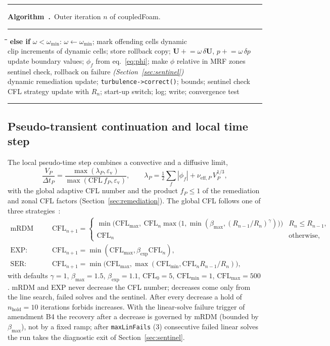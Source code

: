 \documentclass[11pt,a4paper]{article}
\newcounter{algorithm}
\newenvironment{algo}[2]{%
  \par\medskip\noindent
  \begin{minipage}{\linewidth}
  \refstepcounter{algorithm}\label{#2}%
  \hrule\smallskip\noindent\textbf{Algorithm~\thealgorithm.}\ #1\par
  \smallskip\hrule\smallskip\small
  \begin{tabbing}
  \hspace*{2em}\=\hspace*{2em}\=\hspace*{2em}\=\hspace*{2em}\=\kill}
  {\end{tabbing}\vspace*{-1ex}\hrule\end{minipage}\par\medskip}
\newcommand{\vect}[1]{\mathbf{#1}}
\newcommand{\Uv}{\vect{U}}
\newcommand{\dt}{\Delta t}
\newcommand{\VSMALL}{\varepsilon_{\mathrm{v}}}
\newcommand{\code}[1]{\texttt{#1}}
\begin{document}
\begin{algo}{Outer iteration $n$ of coupledFoam.}{alg:outer}
\textbf{else if} $\omega<\omega_{\min}$: $\omega\leftarrow\omega_{\min}$; mark offending cells dynamic\\
clip increments of dynamic cells; store rollback copy; $\Uv\mathrel{+}=\omega\,\delta\Uv$, $p\mathrel{+}=\omega\,\delta p$\\
update boundary values; $\phi_f$ from eq.~\ref{eq:phi}; make $\phi$ relative in MRF zones\\
sentinel check, rollback on failure \quad \textit{(Section~\ref{sec:sentinel})}\\
dynamic remediation update; \code{turbulence->correct()}; bounds; sentinel check\\
CFL strategy update with $R_n$; start-up switch; log; write; convergence test
\end{algo}

\subsection{Pseudo-transient continuation and local time step}\label{sec:ptc}

The local pseudo-time step combines a convective and a diffusive limit,
\begin{equation}
  \frac{V_P}{\dt_P} = \frac{\max(\lambda_P,\VSMALL)}{\max(\mathrm{CFL}\,f_P,\VSMALL)},
  \qquad
  \lambda_P = \tfrac12\sum_f|\phi_f| + \nu_{\mathrm{eff},P}\,V_P^{1/3},
  \label{eq:dt}
\end{equation}
with the global adaptive CFL number and the product $f_P\le1$ of the
remediation and zonal CFL factors (Section~\ref{sec:remediation}). The global
CFL follows one of three strategies~\cite{Ceze2011,Ceze2013AIAA,MulderVanLeer1985}:
\begin{align}
  \text{mRDM (default):}\quad &
  \mathrm{CFL}_{n+1} = \begin{cases}
    \min\!\bigl(\mathrm{CFL}_{\max},\ \mathrm{CFL}_n\max\bigl(1,\min(\beta_{\max},(R_{n-1}/R_n)^{\gamma})\bigr)\bigr) & R_n\le R_{n-1},\\
    \mathrm{CFL}_n & \text{otherwise},\end{cases}\\
  \text{EXP:}\quad & \mathrm{CFL}_{n+1}=\min(\mathrm{CFL}_{\max},\beta_{\exp}\mathrm{CFL}_n),\\
  \text{SER:}\quad & \mathrm{CFL}_{n+1}=\min\bigl(\mathrm{CFL}_{\max},\max(\mathrm{CFL}_{\min},\mathrm{CFL}_n R_{n-1}/R_n)\bigr),
\end{align}
with defaults $\gamma=1$, $\beta_{\max}=1.5$, $\beta_{\exp}=1.1$,
$\mathrm{CFL}_0=5$, $\mathrm{CFL}_{\min}=1$, $\mathrm{CFL}_{\max}=500$. mRDM
and EXP never decrease the CFL number; decreases come only from the line
search, failed solves and the sentinel. After every decrease a hold of
$n_{\mathrm{hold}}=10$ iterations forbids increases. With the linear-solve
failure trigger of amendment B4 the recovery after a decrease is governed by
mRDM (bounded by $\beta_{\max}$), not by a fixed ramp; after
\code{maxLinFails} (3) consecutive failed linear solves the run takes the
diagnostic exit of Section~\ref{sec:sentinel}.
\end{document}
